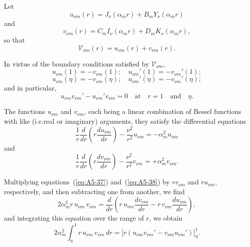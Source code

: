 Let
\begin{equation}
\label{eq:A5-33}
u_{\nu m}(r) = J_\nu(\alpha_m r) + B_m Y_\nu(\alpha_m r)
\end{equation}
and
\begin{equation}
\label{eq:A5-34}
v_{\nu m}(r) = C_m I_\nu(\alpha_m r) + D_m K_\nu(\alpha_m r),
\end{equation}
so that
\begin{equation}
\label{eq:A5-35}
\mathscr{V}_{\nu m}(r) = u_{\nu m}(r) + v_{\nu m}(r).
\end{equation}

In virtue of the boundary conditions satisfied by $\mathscr{V}_{\nu m}$,
\begin{equation}
\label{eq:A5-36}
u_{\nu m}(1) = -v_{\nu m}(1); \quad u_{\nu m}'(1) = -v_{\nu m}'(1);
\end{equation}
\begin{equation}
\label{eq:A5-36a}
u_{\nu m}(\eta) = -v_{\nu m}(\eta); \quad u_{\nu m}'(\eta) = -v_{\nu m}'(\eta);
\end{equation}
and in particular,
\begin{equation}
\label{eq:A5-36b}
u_{\nu m} v_{\nu m}' - u_{\nu m}' v_{\nu m} = 0 \quad \text{at} \quad r = 1 \quad \text{and} \quad \eta.
\end{equation}

The functions $u_{\nu m}$ and $v_{\nu m}$, each being a linear combination of Bessel
functions with like (i.e.\@ real or imaginary) arguments, they satisfy the
differential equations
\begin{equation}
\label{eq:A5-37}
\frac{1}{r}\frac{d}{dr}\left(r\frac{du_{\nu m}}{dr}\right) - \frac{\nu^2}{r^2}u_{\nu m} = -\alpha_m^2 u_{\nu m}
\end{equation}
and
\begin{equation}
\label{eq:A5-38}
\frac{1}{r}\frac{d}{dr}\left(r\frac{dv_{\nu m}}{dr}\right) - \frac{\nu^2}{r^2}v_{\nu m} = +\alpha_m^2 v_{\nu m}.
\end{equation}

Multiplying equations~(\ref{eq:A5-37}) and~(\ref{eq:A5-38}) by $r v_{\nu m}$ and $r u_{\nu m}$, respectively,
and then subtracting one from another, we find
\begin{equation}
\label{eq:A5-39}
2\alpha_m^2 r \, u_{\nu m} \, v_{\nu m} = \frac{d}{dr}\left(r \, u_{\nu m} \frac{dv_{\nu m}}{dr} - r \, v_{\nu m} \frac{du_{\nu m}}{dr}\right),
\end{equation}
and integrating this equation over the range of $r$, we obtain
\begin{equation}
\label{eq:A5-40}
2\alpha_m^2 \int_\eta^1 r \, u_{\nu m} \, v_{\nu m} \, dr = \bigl[r(u_{\nu m} v_{\nu m}' - v_{\nu m} u_{\nu m}')\bigr]_\eta^1.
\end{equation}


